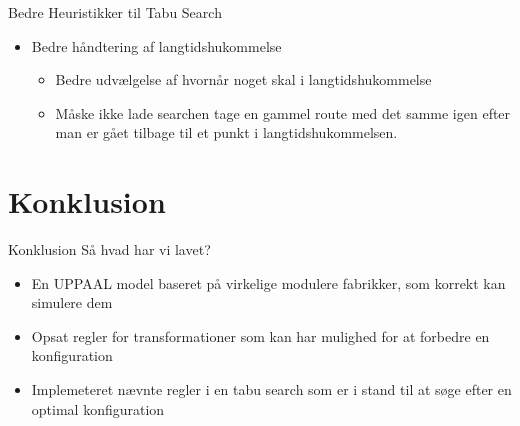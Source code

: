 \begin{frame}{Bedre Heuristikker til Tabu Search}
	\begin{itemize}
		\item Bedre håndtering af langtidshukommelse
		\begin{itemize}
			\item Bedre udvælgelse af hvornår noget skal i langtidshukommelse
			\item Måske ikke lade searchen tage en gammel route med det samme igen efter man er gået tilbage til et punkt i langtidshukommelsen.
		\end{itemize}
	\end{itemize}
\end{frame}


\section{Konklusion}
\begin{frame}{Konklusion}
	Så hvad har vi lavet?
	\begin{itemize}
		\item En UPPAAL model baseret på virkelige modulere fabrikker, som korrekt kan simulere dem
		\item Opsat regler for transformationer som kan har mulighed for at forbedre en konfiguration
		\item Implemeteret nævnte regler i en tabu search som er i stand til at søge efter en optimal konfiguration
	\end{itemize}
\end{frame}

